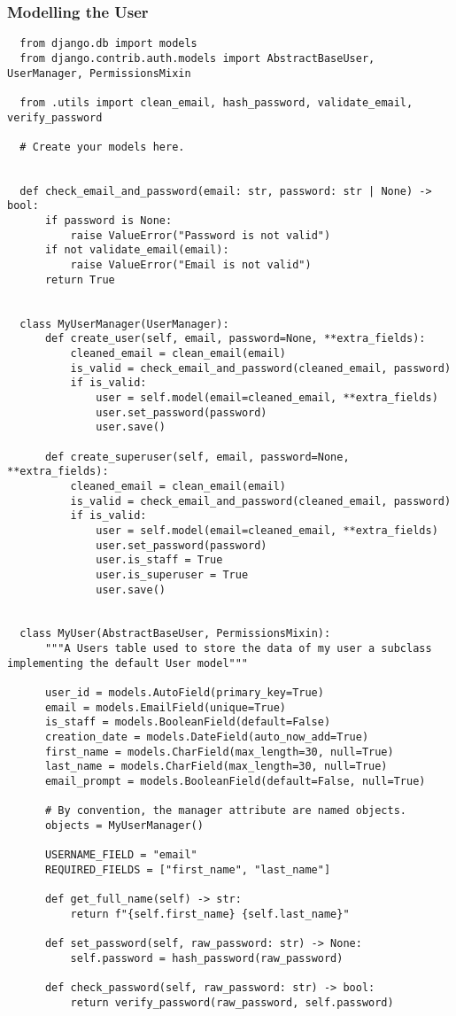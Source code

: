 \subsubsection{Modelling the User}
\begin{verbatim}
  from django.db import models
  from django.contrib.auth.models import AbstractBaseUser, UserManager, PermissionsMixin
  
  from .utils import clean_email, hash_password, validate_email, verify_password
  
  # Create your models here.
  
  
  def check_email_and_password(email: str, password: str | None) -> bool:
      if password is None:
          raise ValueError("Password is not valid")
      if not validate_email(email):
          raise ValueError("Email is not valid")
      return True
  
  
  class MyUserManager(UserManager):
      def create_user(self, email, password=None, **extra_fields):
          cleaned_email = clean_email(email)
          is_valid = check_email_and_password(cleaned_email, password)
          if is_valid:
              user = self.model(email=cleaned_email, **extra_fields)
              user.set_password(password)
              user.save()
  
      def create_superuser(self, email, password=None, **extra_fields):
          cleaned_email = clean_email(email)
          is_valid = check_email_and_password(cleaned_email, password)
          if is_valid:
              user = self.model(email=cleaned_email, **extra_fields)
              user.set_password(password)
              user.is_staff = True
              user.is_superuser = True
              user.save()
  
  
  class MyUser(AbstractBaseUser, PermissionsMixin):
      """A Users table used to store the data of my user a subclass implementing the default User model"""
  
      user_id = models.AutoField(primary_key=True)
      email = models.EmailField(unique=True)
      is_staff = models.BooleanField(default=False)
      creation_date = models.DateField(auto_now_add=True)
      first_name = models.CharField(max_length=30, null=True)
      last_name = models.CharField(max_length=30, null=True)
      email_prompt = models.BooleanField(default=False, null=True)
  
      # By convention, the manager attribute are named objects.
      objects = MyUserManager()
  
      USERNAME_FIELD = "email"
      REQUIRED_FIELDS = ["first_name", "last_name"]
  
      def get_full_name(self) -> str:
          return f"{self.first_name} {self.last_name}"
  
      def set_password(self, raw_password: str) -> None:
          self.password = hash_password(raw_password)
  
      def check_password(self, raw_password: str) -> bool:
          return verify_password(raw_password, self.password)
  
\end{verbatim}
